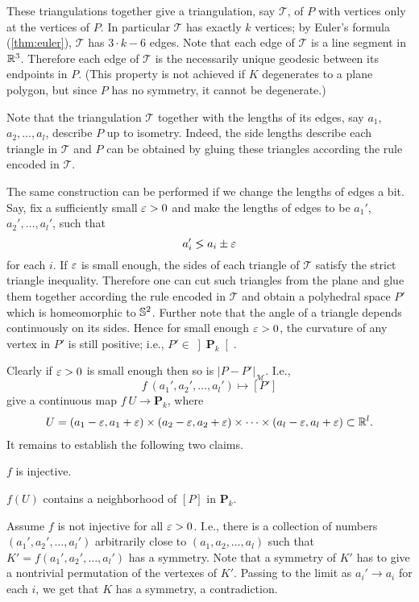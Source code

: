 These triangulations together give a triangulation, 
say $\mathcal{T}$,
of $P$ with vertices only at the vertices of $P$.
In particular $\mathcal{T}$ has exactly $k$ vertices;
by  Euler's formula (\ref{thm:euler}), 
$\mathcal{T}$ has $3\cdot k-6$ edges.
Note that each edge of $\mathcal{T}$ is a line segment in $\mathbb{R}^3$.
Therefore each edge of $\mathcal{T}$ is the necessarily unique geodesic between its endpoints in $P$.
(This property is not achieved  if $K$ degenerates to a plane polygon, but since $P$ has no symmetry, it cannot be degenerate.)

Note that the triangulation $\mathcal{T}$ together with the lengths of its edges, 
say $a_1$, $a_2,\dots,a_l$, 
describe $P$ up to isometry.
Indeed, the side lengths describe each triangle in $\mathcal{T}$
and $P$ can be obtained by gluing these triangles according the rule encoded in $\mathcal{T}$.

The same construction can be performed 
if we change the lengths of edges a bit.
Say, fix a sufficiently small $\varepsilon>0$ 
and make the lengths of edges to be 
$a_1'$, $a_2',\dots, a_l'$,
such that 
$$a_i'\lg a_i\pm\eps$$ 
for each $i$.
If $\varepsilon$ is small enough,
the sides of each triangle of $\mathcal{T}$ satisfy the strict triangle inequality.
Therefore one can cut such triangles from the plane and glue them 
together according the rule encoded in $\mathcal{T}$ and obtain a polyhedral space $P'$ which is homeomorphic to $\mathbb{S}^2$.
Further note that the angle of a triangle depends continuously on its sides.
Hence for small enough $\varepsilon>0$, 
the curvature of any vertex in $P'$ is still positive;
i.e., $P'\in\left]  \mathbf{P}_k\right[$.

Clearly if $\varepsilon>0$ is small enough
then so is $|P-P'|_{\mathcal{M}}$.
I.e.,
$$f\:(a_1', a_2',\dots, a_l')
\mapsto 
[P']$$ 
give a continuous map 
$f\:U\to\mathbf{P}_k$,
where
\begin{align*}
 U=(a_1-\varepsilon,a_1+\varepsilon)\times (a_2-\varepsilon,a_2+\varepsilon)
\times\dots\times
(a_l-\varepsilon,a_l+\varepsilon)
\subset
\mathbb{R}^l.
\end{align*}
It remains to establish the following two claims. 
\begin{clm}{}\label{clm:injective}
$f$ is injective. 
\end{clm}
 
\begin{clm}{}\label{clm:surjective} $f(U)$ contains a neighborhood of $[P]$ in $\mathbf{P}_k$.
\end{clm}

Assume $f$ is not injective for all $\varepsilon>0$.
I.e.,
there is a collection of numbers $(a_1',a_2',\dots, a_l')$ arbitrarily close to $(a_1,a_2,\dots, a_l)$ such that $K'=f(a_1',a_2',\dots, a_l')$ has a symmetry.
Note that a symmetry of $K'$ has to give a nontrivial permutation of the vertexes of $K'$.
Passing to the limit as $a_i'\to a_i$ for each $i$,
we get that $K$ has a symmetry,
a contradiction.

